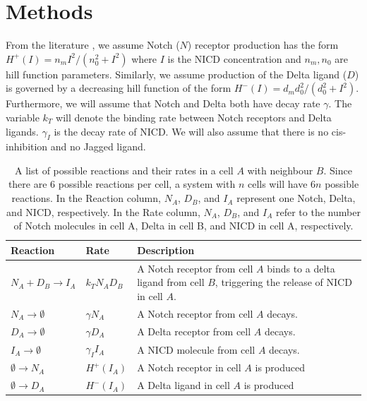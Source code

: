 \documentclass{article}
\begin{document}
\section*{Methods}

From the literature \cite{collier_pattern_1996, boareto_jaggeddelta_2015}, we assume Notch ($N$) receptor production has the form $H^{+}(I) = n_{m}I^2/(n_{0}^2 + I^2)$ where $I$ is the NICD concentration and $n_{m}, n_{0}$ are hill function parameters.
Similarly, we assume production of the Delta ligand ($D$) is governed by a decreasing hill function of the form $H^{-}(I) = d_{m}d_{0}^2/(d_{0}^2 + I^2)$.
Furthermore, we will assume that Notch and Delta both have decay rate $\gamma$.
The variable $k_{T}$ will denote the binding rate between Notch receptors and Delta ligands.
$\gamma_{I}$ is the decay rate of NICD.
We will also assume that there is no cis-inhibition and no Jagged ligand. 

\begin{table}[!htp]
\centering
\begin{tabular}{|m{8em}|m{5em}|m{20em}|} 
 \hline
 Reaction & Rate & Description \\ 
 \hline
 $N_{A} + D_{B} \rightarrow I_{A}$ & 
 $k_{T} N_{A}D_{B}$ &
 A Notch receptor from cell $A$ binds to a delta ligand from cell $B$, triggering the release of NICD in cell $A$. \\
 \hline
 $N_{A} \rightarrow \emptyset$ & 
 $\gamma N_{A}$ & 
 A Notch receptor from cell $A$ decays. \\
 \hline
 $D_{A} \rightarrow \emptyset$ & 
 $\gamma D_{A}$ & 
 A Delta receptor from cell $A$ decays. \\
 \hline
 $I_{A} \rightarrow \emptyset$ &
 $\gamma_{I} I_{A}$ &
 A NICD molecule from cell $A$ decays.  \\
 \hline
 $\emptyset \rightarrow N_{A}$ & 
 $H^{+}(I_{A})$ &
 A Notch receptor in cell $A$ is produced \\
 \hline
 $\emptyset \rightarrow D_{A}$ &
 $H^{-}(I_{A})$ &
 A Delta ligand in cell $A$ is produced \\
 \hline
\end{tabular}
\caption{
  A list of possible reactions and their rates in a cell $A$ with neighbour $B$.
  Since there are $6$ possible reactions per cell, a system with $n$ cells will have $6n$ possible reactions.
  In the Reaction column, $N_A$, $D_B$, and $I_A$ represent one Notch, Delta, and NICD, respectively. In the Rate column, $N_A$, $D_B$, and $I_A$ refer to the number of Notch molecules in cell A, Delta in cell B, and NICD in cell A, respectively.
}
\label{tb:reactions}
\end{table}
\end{document}

